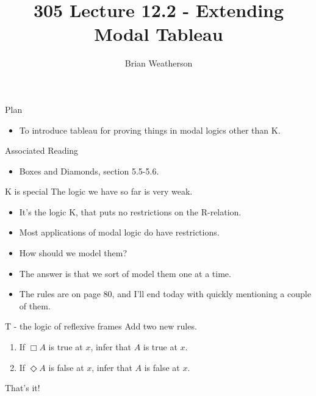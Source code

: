 \documentclass[
  ignorenonframetext,
]{beamer}
\title{305 Lecture 12.2 - Extending Modal Tableau}
\author{Brian Weatherson}
\date{}
\providecommand{\tightlist}{%
  \setlength{\itemsep}{0pt}\setlength{\parskip}{0pt}}
\renewcommand{\,}{\text{, }}
\begin{document}
\frame{\titlepage}

\begin{frame}{Plan}
\protect\hypertarget{plan}{}
\begin{itemize}
\tightlist
\item
  To introduce tableau for proving things in modal logics other than K.
\end{itemize}
\end{frame}

\begin{frame}{Associated Reading}
\protect\hypertarget{associated-reading}{}
\begin{itemize}
\tightlist
\item
  Boxes and Diamonds, section 5.5-5.6.
\end{itemize}
\end{frame}

\begin{frame}{K is special}
\protect\hypertarget{k-is-special}{}
The logic we have so far is very weak.

\begin{itemize}
\tightlist
\item
  It's the logic K, that puts no restrictions on the R-relation.
\item
  Most applications of modal logic do have restrictions.
\item
  How should we model them? \pause 
\item
  The answer is that we sort of model them one at a time.
\item
  The rules are on page 80, and I'll end today with quickly mentioning a
  couple of them.
\end{itemize}
\end{frame}

\begin{frame}{T - the logic of reflexive frames}
\protect\hypertarget{t---the-logic-of-reflexive-frames}{}
Add two new rules.

\begin{enumerate}
\tightlist
\item
  If \(\Box A\) is true at \(x\), infer that \(A\) is true at \(x\).
\item
  If \(\Diamond A\) is false at \(x\), infer that \(A\) is false at
  \(x\).
\end{enumerate}

That's it!
\end{frame}
\end{document}
